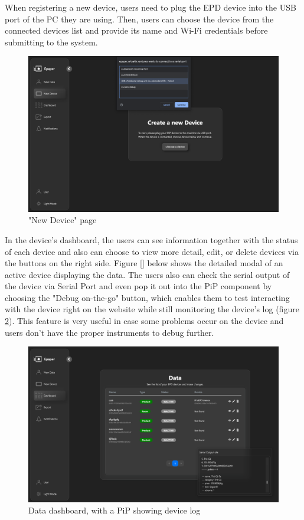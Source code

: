 \documentclass[../Main.tex]{subfiles}
\begin{document}
When registering a new device, users need to plug the \gls{EPD} device into the USB port of the PC they are using. Then, users can choose the device from the connected devices list and provide its name and Wi-Fi credentials before submitting to the system.

\begin{figure}[H]
    \centering
    \includegraphics[width=0.87\linewidth]{doc//imgs/ui_new-device.png}
    \caption{"New Device" page}
    \label{fig:ui_new-device}
\end{figure}
In the device's dashboard, the users can see information together with the status of each device and also can choose to view more detail, edit, or delete devices via the buttons on the right side. Figure \ref{} below shows the detailed modal of an active device displaying the data. The users also can check the serial output of the device via Serial Port and even pop it out into the PiP component by choosing the "Debug on-the-go" button, which enables them to test interacting with the device right on the website while still monitoring the device's log (figure \ref{fig:data-dashboard}). This feature is very useful in case some problems occur on the device and users don't have the proper instruments to debug further.

\begin{figure}[H]
        \centering
        \includegraphics[width=0.87\linewidth]{doc//imgs/ui_data-dashboard.png}
        \caption{Data dashboard, with a PiP showing device log}
        \label{fig:data-dashboard}
\end{figure}
\end{document}
